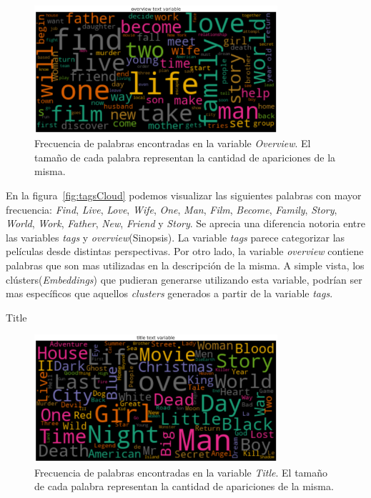 \documentclass[11pt,a4paper,twoside]{thesis}
\begin{document}
\begin{figure}[h!]
	\centering
	\includegraphics[width=9cm]{./images/Cloud-Overview.png}
	\caption{Frecuencia de palabras encontradas en la variable \textit{Overview}. El tamaño de cada palabra representan la cantidad de apariciones de la misma.}
	\label{fig:overviewCloud}
\end{figure}

En la figura~\ref{fig:tagsCloud} podemos visualizar las siguientes palabras con
mayor frecuencia: \textit{Find}, \textit{Live}, \textit{Love}, \textit{Wife},
\textit{One}, \textit{Man}, \textit{Film}, \textit{Become}, \textit{Family},
\textit{Story}, \textit{World}, \textit{Work}, \textit{Father}, \textit{New},
\textit{Friend} y \textit{Story}. Se aprecia una diferencia notoria entre las
variables \textit{tags} y \textit{overview}(Sinopsis). La variable
\textit{tags} parece categorizar las películas desde distintas perspectivas.
Por otro lado, la variable \textit{overview} contiene palabras que son mas
utilizadas en la descripción de la misma. A simple vista, los
clústers(\textit{Embeddings}) que pudieran generarse utilizando esta variable,
podrían ser mas específicos que aquellos \textit{clusters} generados a partir
de la variable \textit{tags}.

\begin{description}
	\item[Title]
\end{description}

\begin{figure}[h!]
	\centering
	\includegraphics[width=9cm]{./images/Cloud-Title.png}
	\caption{Frecuencia de palabras encontradas en la variable \textit{Title}. El tamaño de cada palabra representan la cantidad de apariciones de la misma.}
	\label{fig:titleCloud}
\end{figure}
\end{document}
